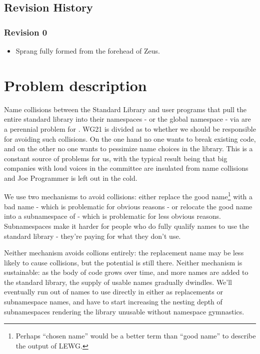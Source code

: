 \section{Revision History}
\subsection{Revision 0}
\begin{itemize}
\item Sprang fully formed from the forehead of Zeus.
\end{itemize}

\chapter{Problem description}

Name collisions between the Standard Library and user programs that pull the
entire standard library into their namespaces - or the global namespace - via
 are a perennial problem for \Cpp. WG21 is divided
as to whether we should be responsible for avoiding such collisions. On the one
hand no one wants to break existing code, and on the other no one wants to
pessimize name choices in the library. This is a constant source of problems for
us, with the typical result being that big companies with loud voices in the
committee are insulated from name collisions and Joe Programmer is left out in
the cold.

We use two mechanisms to avoid collisions: either replace the good
name\footnote{Perhaps ``chosen name'' would be a better term than ``good name''
to describe the output of LEWG.} with a bad name - which is problematic for
obvious reasons - or relocate the good name into a subnamespace of  -
which is problematic for less obvious reasons. Subnamespaces make it harder for
people who do fully qualify names to use the standard library - they're paying
for what they don't use.

Neither mechanism avoids collions entirely: the replacement name may be less
likely to cause collisions, but the potential is still there. Neither mechanism
is sustainable: as the body of \Cpp{} code grows over time, and more names are
added to the standard library, the supply of usable names gradually dwindles.
We'll eventually run out of names to use directly in  either as
replacements or subnamespace names, and have to start increasing the nesting
depth of subnamespaces rendering the library unusable without namespace
gymnastics.

